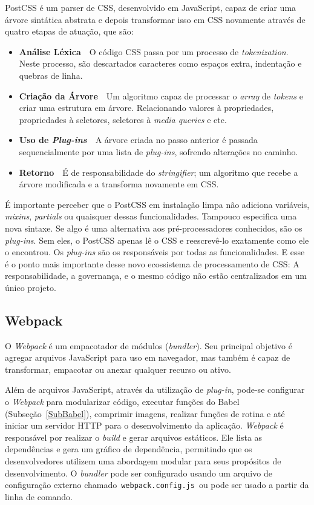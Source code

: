 PostCSS é um parser de CSS, desenvolvido em JavaScript, capaz de criar uma árvore sintática abstrata e depois transformar isso em CSS novamente através de quatro etapas de atuação, que são:
\begin{itemize}
    \item \textbf{Análise Léxica}~\textemdash~O código CSS passa por um processo de \textit{tokenization}. Neste processo, são descartados caracteres como espaços extra, indentação e quebras de linha.
    \item \textbf{Criação da Árvore}~\textemdash~Um algoritmo capaz de processar o \textit{array} de \textit{tokens} e criar uma estrutura em árvore. Relacionando valores à propriedades, propriedades à seletores, seletores à \textit{media queries} e etc.
    \item \textbf{Uso de \textit{Plug-ins}}~\textemdash~A árvore criada no passo anterior é passada sequencialmente por uma lista de \textit{plug-ins}, sofrendo alterações no caminho.
    \item \textbf{Retorno}~\textemdash~É de responsabilidade do \textit{stringifier}; um algoritmo que recebe a árvore modificada e a transforma novamente em CSS.
\end{itemize}

É importante perceber que o PostCSS em instalação limpa não adiciona variáveis, \textit{mixins}, \textit{partials} ou quaisquer dessas funcionalidades. Tampouco especifica uma nova sintaxe. Se algo é uma alternativa aos pré-processadores conhecidos, são os \textit{plug-ins}. Sem eles, o PostCSS apenas lê o CSS e reescrevê-lo exatamente como ele o encontrou. Os \textit{plug-ins} são os responsáveis por todas as funcionalidades. E esse é o ponto mais importante desse novo ecossistema de processamento de CSS: A responsabilidade, a governança, e o mesmo código não estão centralizados em um único projeto.
%
%
%
\subsection{Webpack}
\label{SubWebpack}

O \textit{Webpack} é um empacotador de módulos (\textit{bundler}). Seu principal objetivo é agregar arquivos JavaScript para uso em navegador, mas também é capaz de transformar, empacotar ou anexar qualquer recurso ou ativo.

Além de arquivos JavaScript, através da utilização de \textit{plug-in}, pode-se configurar o \textit{Webpack} para modularizar código, executar funções do Babel (Subseção~\ref{SubBabel}), comprimir imagens, realizar funções de rotina e até iniciar um servidor HTTP para o desenvolvimento da aplicação. \textit{Webpack} é responsável por realizar o \textit{build} e gerar arquivos estáticos. Ele lista as dependências e gera um gráfico de dependência, permitindo que os desenvolvedores utilizem uma abordagem modular para seus propósitos de desenvolvimento. O \textit{bundler} pode ser configurado usando um arquivo de configuração externo chamado~\texttt{webpack.config.js}~ou pode ser usado a partir da linha de comando.
%
%
%
